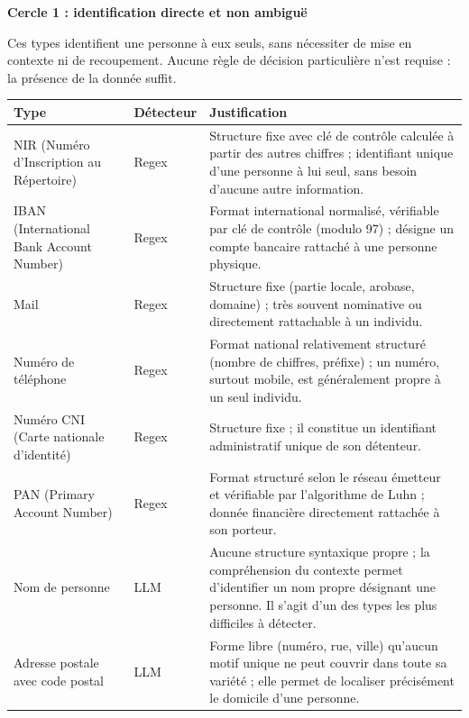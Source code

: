 \documentclass[12pt,a4paper]{article}
\begin{document}
\medskip
\noindent\textbf{Cercle 1 : identification directe et non ambiguë}

\smallskip

Ces types identifient une personne à eux seuls, sans nécessiter de mise en
contexte ni de recoupement. Aucune règle de décision particulière n'est
requise : la présence de la donnée suffit.

\renewcommand{\arraystretch}{1.3}
\begin{longtable}{
    p{3.2cm}
    @{\hspace{0.4cm}}
    p{1.8cm}
    @{\hspace{0.4cm}}
    p{8.5cm}
}
\toprule
\textbf{Type} & \textbf{Détecteur} & \textbf{Justification} \\
\midrule
\endhead

NIR (Numéro d’Inscription au Répertoire)
& Regex
& Structure fixe avec clé de contrôle calculée à partir des autres chiffres ;
identifiant unique d'une personne à lui seul, sans besoin d'aucune autre
information. \\

IBAN (International Bank Account Number)
& Regex
& Format international normalisé, vérifiable par clé de contrôle
(modulo 97) ; désigne un compte bancaire rattaché à une personne physique. \\

Mail
& Regex
& Structure fixe (partie locale, arobase, domaine) ; très souvent nominative
ou directement rattachable à un individu. \\

Numéro de téléphone
& Regex
& Format national relativement structuré (nombre de chiffres, préfixe) ;
un numéro, surtout mobile, est généralement propre à un seul individu. \\

Numéro CNI (Carte nationale d'identité)
& Regex
& Structure fixe ; il constitue un identifiant administratif unique de son
détenteur. \\

PAN (Primary Account Number)
& Regex
& Format structuré selon le réseau émetteur et vérifiable par l'algorithme
de Luhn ; donnée financière directement rattachée à son porteur. \\

Nom de personne
& LLM
& Aucune structure syntaxique propre ; la compréhension du contexte permet
d'identifier un nom propre désignant une personne. Il s'agit d'un des types
les plus difficiles à détecter. \\

Adresse postale avec code postal
& LLM
& Forme libre (numéro, rue, ville) qu'aucun motif unique ne peut couvrir dans
toute sa variété ; elle permet de localiser précisément le domicile d'une
personne. \\

\bottomrule
\end{longtable}
\end{document}
